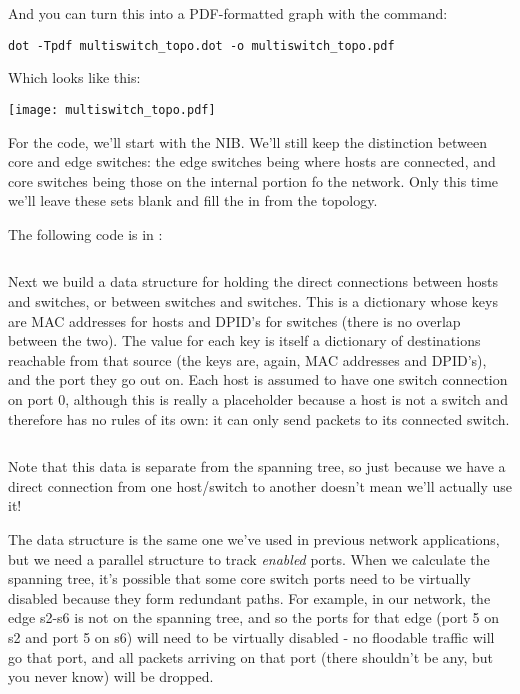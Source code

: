 And you can turn this into a PDF-formatted graph with the command:

\begin{verbatim}
dot -Tpdf multiswitch_topo.dot -o multiswitch_topo.pdf
\end{verbatim}

Which looks like this:

\texttt{[image: multiswitch\_topo.pdf]}

For the code, we'll start with the NIB.  We'll still keep the distinction between core and edge switches:
the edge switches being where hosts are connected, and core switches being those on the internal
portion fo the network.  Only this time we'll leave these sets blank and fill the in from the topology.

The following code is in  :

\inputminted[firstline=15,lastline=16]{python}{code/multiswitch_topologies/network_information_base_from_file.py}

Next we build a data structure for holding the direct connections between hosts and switches, or
between switches and switches.  This is a dictionary whose keys are MAC addresses for hosts and DPID's for
switches (there is no overlap between the two).  The value for each key is itself a dictionary of destinations
reachable from that source (the keys are, again, MAC addresses and DPID's), and the port they go out on.
Each host is assumed to have one switch connection on port 0, although this is really a placeholder because a host is not
a switch and therefore has no rules of its own: it can only send packets to its connected switch.  

\inputminted[firstline=21,lastline=27]{python}{code/multiswitch_topologies/network_information_base_from_file.py}

Note that this data is separate from the spanning tree, so just because we have a direct connection from one
host/switch to another doesn't mean we'll actually use it!

The  data structure is the same one we've used in previous network applications, but
we need a parallel structure to track \emph{enabled} ports.  When we calculate the spanning tree, it's
possible that some core switch ports need to be virtually disabled because they form 
redundant paths.  For example, in our network, the edge s2-s6 is not on the spanning tree, and so the ports
for that edge (port 5 on s2 and port 5 on s6) will need to be virtually disabled - no floodable traffic
will go that port, and all packets arriving on that port (there shouldn't be any, but you never know) will
be dropped.


